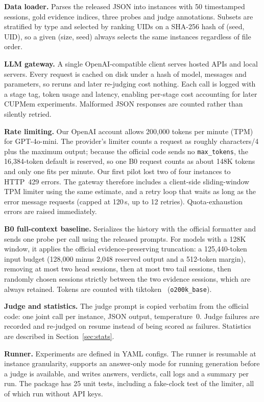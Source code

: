 \documentclass[conference]{IEEEtran}
\newcommand{\code}[1]{\texttt{\small #1}}
\begin{document}
\textbf{Data loader.} Parses the released JSON into instances with 50 timestamped sessions, gold evidence indices, three probes and judge annotations. Subsets are stratified by type and selected by ranking UIDs on a SHA-256 hash of (seed, UID), so a given (size, seed) always selects the same instances regardless of file order.

\textbf{LLM gateway.} A single OpenAI-compatible client serves hosted APIs and local servers. Every request is cached on disk under a hash of model, messages and parameters, so reruns and later re-judging cost nothing. Each call is logged with a stage tag, token usage and latency, enabling per-stage cost accounting for later CUPMem experiments. Malformed JSON responses are counted rather than silently retried.

\textbf{Rate limiting.} Our OpenAI account allows 200{,}000 tokens per minute (TPM) for GPT-4o-mini. The provider's limiter counts a request as roughly characters/4 plus the maximum output; because the official code sends no \code{max\_tokens}, the 16{,}384-token default is reserved, so one B0 request counts as about 148K tokens and only one fits per minute. Our first pilot lost two of four instances to HTTP~429 errors. The gateway therefore includes a client-side sliding-window TPM limiter using the same estimate, and a retry loop that waits as long as the error message requests (capped at 120\,s, up to 12 retries). Quota-exhaustion errors are raised immediately.

\textbf{B0 full-context baseline.} Serializes the history with the official formatter and sends one probe per call using the released prompts. For models with a 128K window, it applies the official evidence-preserving truncation: a 125{,}440-token input budget (128{,}000 minus 2{,}048 reserved output and a 512-token margin), removing at most two head sessions, then at most two tail sessions, then randomly chosen sessions strictly between the two evidence sessions, which are always retained. Tokens are counted with tiktoken~\cite{tiktoken} (\code{o200k\_base}).

\textbf{Judge and statistics.} The judge prompt is copied verbatim from the official code: one joint call per instance, JSON output, temperature~0. Judge failures are recorded and re-judged on resume instead of being scored as failures. Statistics are described in Section~\ref{sec:stats}.

\textbf{Runner.} Experiments are defined in YAML configs. The runner is resumable at instance granularity, supports an answer-only mode for running generation before a judge is available, and writes answers, verdicts, call logs and a summary per run. The package has 25 unit tests, including a fake-clock test of the limiter, all of which run without API keys.
\end{document}
